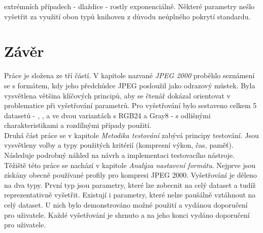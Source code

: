 extrémních případech - dlaždice - rostly exponenciálně. Některé parametry nešlo vyšetřit za využití obou typů knihoven z důvodu neúplného pokrytí standardu. 

\chapter{Závěr}
\label{zaver}
Práce je složena ze tří částí. V kapitole nazvané \textit{JPEG 2000} proběhlo seznámení se s formátem, kdy jeho předchůdce JPEG posloužil jako odrazový můstek. Byla vysvětlena většina klíčových principů, aby se čtenář dokázal orientovat v problematice při vyšetřování parametrů. Pro vyšetřování bylo sestaveno celkem 5 datasetů - , ,  a  ve dvou variantách s RGB24 a Gray8 - s odlišnými charakteristikami a rozdílnými případy použití.\\
Druhá část práce se v kapitole \textit{Metodika testování} zabývá principy testování. Jsou vysvětleny volby a typy použitých kritérií (kompresní výkon, čas, paměť). Následuje podrobný náhled na návrh a implementaci testovacího nástroje.\\ 
Těžiště této práce se nachází v kapitole \textit{Analýza nastavení formátu}. Nejprve jsou získány obecně používané profily pro kompresi JPEG 2000. Vyšetřování je děleno na dva typy. První typ jsou parametry, které lze zobecnit na celý dataset a tudíž reprezentativně vyšetřit. Existují i parametry, které nelze paušálně vztáhnout na celý dataset. U nich bylo demonstrováno možné použití a vydánou doporučení pro uživatele. Každé vyšetřování je shrnuto a na jeho konci vydáno doporučení pro uživatele.





